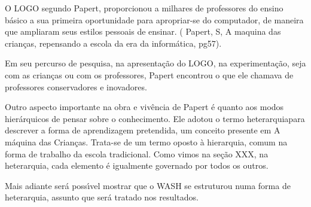 \documentclass[
12pt,		%
openright,	%
twoside,  %
a4paper,			%
chapter=TITLE,		%
english,			%
french,				%
spanish,			%
brazil				%
]{USPSC-classe/USPSC}
\begin{document}
O LOGO segundo Papert,  proporcionou a milhares de professores do ensino b\'asico a sua primeira oportunidade para apropriar-se do computador, de maneira que ampliaram seus estilos pessoais de ensinar. ( Papert, S, \textquotedbl A maquina das crian\c{c}as, repensando a escola da era da inform\'atica\textquotedbl  , pg57).

















Em seu percurso de pesquisa, na apresenta\c{c}\~ao do LOGO, na experimenta\c{c}\~ao, seja com as crian\c{c}as ou com os professores, Papert encontrou o que ele chamava de \textquotedbl professores conservadores e  inovadores\textquotedbl  [XXX].

















Outro aspecto importante na obra e viv\^encia de Papert \'e quanto aos modos hier\'arquicos de pensar sobre o conhecimento.  Ele adotou o termo  \textquotedbl heterarquia\textquotedbl  para descrever a forma de aprendizagem pretendida, um conceito presente em  \textquotedbl A m\'aquina das Crian\c{c}as\textquotedbl . Trata-se de  um termo oposto \`a hierarquia, comum na forma de trabalho da escola tradicional. Como vimos na se\c{c}\~ao XXX, na heterarquia, cada elemento \'e igualmente governado por todos os outros.

















Mais adiante ser\'a poss\'{\i}vel mostrar que o WASH se estruturou numa forma de heterarquia, assunto que ser\'a tratado nos resultados.
\end{document}
